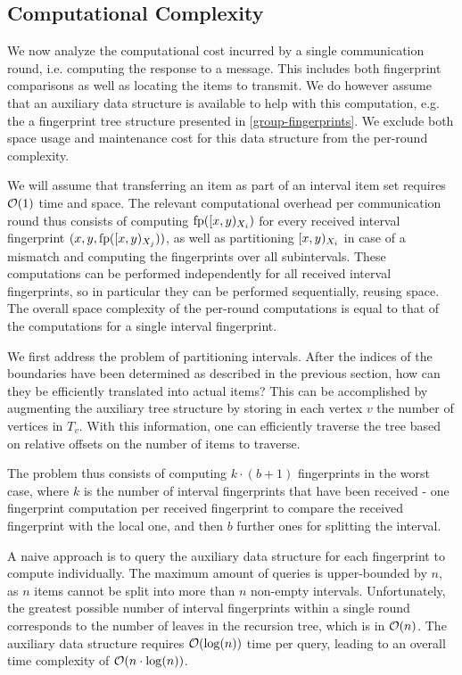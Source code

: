 \subsection{Computational Complexity}

We now analyze the computational cost incurred by a single communication round, i.e. computing the response to a message. This includes both fingerprint comparisons as well as locating the items to transmit. We do however assume that an auxiliary data structure is available to help with this computation, e.g. the a fingerprint tree structure presented in \cref{group-fingerprints}. We exclude both space usage and maintenance cost for this data structure from the per-round complexity.

We will assume that transferring an item as part of an interval item set requires $\mathcal{O}(1)$ time and space. The relevant computational overhead per communication round thus consists of computing $\operatorname{fp}([{x},{y})_{X_i})$ for every received interval fingerprint $({x}, {y}, {\operatorname{fp}([{x},{y})_{X_j})})$, as well as partitioning $[{x},{y})_{X_i}$ in case of a mismatch and computing the fingerprints over all subintervals. These computations can be performed independently for all received interval fingerprints, so in particular they can be performed sequentially, reusing space. The overall space complexity of the per-round computations is equal to that of the computations for a single interval fingerprint.

We first address the problem of partitioning intervals. After the indices of the boundaries have been determined as described in the previous section, how can they be efficiently translated into actual items? This can be accomplished by augmenting the auxiliary tree structure by storing in each vertex $v$ the number of vertices in $T_v$. With this information, one can efficiently traverse the tree based on relative offsets on the number of items to traverse.

The problem thus consists of computing $k \cdot (b + 1)$ fingerprints in the worst case, where $k$ is the number of interval fingerprints that have been received - one fingerprint computation per received fingerprint to compare the received fingerprint with the local one, and then $b$ further ones for splitting the interval.

A naive approach is to query the auxiliary data structure for each fingerprint to compute individually. The maximum amount of queries is upper-bounded by $n$, as $n$ items cannot be split into more than $n$ non-empty intervals. Unfortunately, the greatest possible number of interval fingerprints within a single round corresponds to the number of leaves in the recursion tree, which is in $\mathcal{O}(n)$. The auxiliary data structure requires $\mathcal{O}(\log(n))$ time per query, leading to an overall time complexity of $\mathcal{O}(n \cdot \log(n))$.


